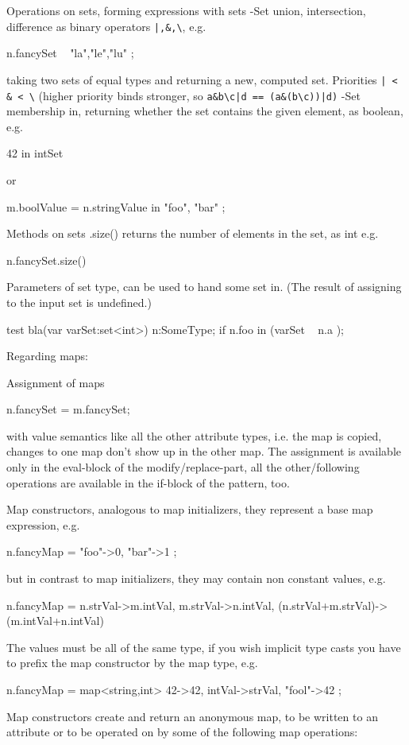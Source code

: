 Operations on sets, forming expressions with sets
-Set union, intersection, difference as binary operators \verb#|,&,\#, e.g. 
\begin{grgenlet}
n.fancySet \ { "la","le","lu" };
\end{grgenlet}
taking two sets of equal types and returning a new, computed set.
Priorities \verb#| < & < \# (higher priority binds stronger, so
\verb#a&b\c|d == (a&(b\c))|d)#
-Set membership in, returning whether the set contains the given element, as boolean, e.g. \begin{grgenlet}
42 in intSet
\end{grgenlet}
or
\begin{grgenlet}
m.boolValue = n.stringValue in { "foo", "bar" };
\end{grgenlet}

Methods on sets
.size() returns the number of elements in the set, as int
e.g.
\begin{grgenlet}
n.fancySet.size()
\end{grgenlet}

Parameters of set type, can be used to hand some set in.
(The result of assigning to the input set is undefined.)
\begin{grgen}
test bla(var varSet:set<int>) 
{
	n:SomeType;
	if { n.foo in (varSet \ { n.a }); }
}
\end{grgen}

Regarding maps:

Assignment of maps
\begin{grgenlet}
n.fancySet = m.fancySet;
\end{grgenlet}
with value semantics like all the other attribute types, 
i.e. the map is copied, changes to one map don't show up in the other map.
The assignment is available only in the eval-block of the modify/replace-part, 
all the other/following operations are available in the if-block of the pattern, too.

Map constructors, analogous to map initializers, they represent a base map expression, e.g. 
\begin{grgenlet}
n.fancyMap = { "foo"->0, "bar"->1 };
\end{grgenlet}
but in contrast to map initializers, they may contain non constant values, e.g.
\begin{grgenlet}
n.fancyMap = { n.strVal->m.intVal, m.strVal->n.intVal, (n.strVal+m.strVal)->(m.intVal+n.intVal) } 
\end{grgenlet}
The values must be all of the same type, if you wish implicit type casts 
you have to prefix the map constructor by the map type, e.g.
\begin{grgenlet}
n.fancyMap = map<string,int>{ 42->42, intVal->strVal, "fool"->42 };
\end{grgenlet}
Map constructors create and return an anonymous map, to be written to an attribute or to be operated on by some of the following map operations:

